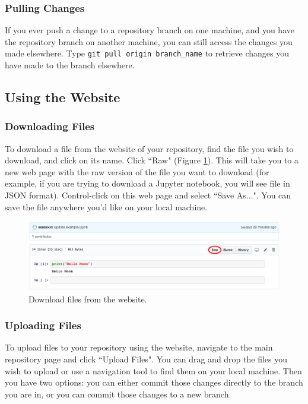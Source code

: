 \documentclass[11pt,a4paper]{article}
\begin{document}
\subsubsection{Pulling Changes}
If you ever push a change to a repository branch on one machine, and you have the repository branch on another machine, you can still access the changes you made elsewhere.
Type \texttt{git pull origin branch\_name} to retrieve changes you have made to the branch elsewhere.

\subsection{Using the Website} \label{website}
\subsubsection{Downloading Files}
To download a file from the website of your repository, find the file you wish to download, and click on its name.
Click ``Raw" (Figure \ref{fig:download}).
This will take you to a new web page with the raw version of the file you want to download (for example, if you are trying to download a Jupyter notebook, you will see file in JSON format).
Control-click on this web page and select ``Save As...".
You can save the file anywhere you'd like on your local machine.

\begin{figure}[h!]
\centering
\includegraphics[width=.7\textwidth]{figures/download.png}
\caption{Download files from the website.}
\label{fig:download}
\end{figure}

\subsubsection{Uploading Files}
To upload files to your repository using the website, navigate to the main repository page and click ``Upload Files".
You can drag and drop the files you wish to upload or use a navigation tool to find them on your local machine.
Then you have two options: you can either commit those changes directly to the branch you are in, or you can commit those changes to a new branch.
\end{document}
